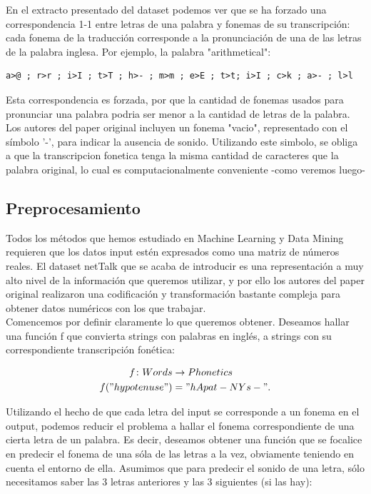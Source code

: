 \documentclass[paper=a4, fontsize=11pt]{scrartcl} %
\numberwithin{equation}{section} %
\numberwithin{figure}{section} %
\numberwithin{table}{section} %
\begin{document}
En el extracto presentado del dataset podemos ver que se ha forzado una correspondencia 1-1 entre letras de una palabra y fonemas de su transcripción: cada fonema de la traducción corresponde a la pronunciación de una de las letras de la palabra inglesa. Por ejemplo, la palabra "arithmetical": 

\begin{center}

\begin{BVerbatim}
a>@ ; r>r ; i>I ; t>T ; h>- ; m>m ; e>E ; t>t; i>I ; c>k ; a>- ; l>l               
\end{BVerbatim}

\end{center}

Esta correspondencia es forzada, por que la cantidad de fonemas usados para pronunciar una palabra podria ser menor a la cantidad de letras de la palabra. Los autores del paper original incluyen un fonema "vacio", representado con el símbolo '-', para indicar la ausencia de sonido. Utilizando este simbolo, se obliga a que la transcripcion fonetica tenga la misma cantidad de caracteres que la palabra original, lo cual es computacionalmente conveniente -como veremos luego-



\subsection{Preprocesamiento}

Todos los métodos que hemos estudiado en Machine Learning y Data Mining requieren que los datos input estén  expresados como una matriz de números reales. El dataset netTalk que se acaba de introducir es una representación a muy alto nivel de la información que queremos utilizar, y por ello los autores del paper original realizaron una codificación y transformación bastante compleja para obtener datos numéricos con los que trabajar. \\

Comencemos por definir claramente lo que queremos obtener. Deseamos hallar una función f que convierta strings con palabras en inglés, a strings con su correspondiente transcripción fonética:

\begin{align*}
  f \colon Words &\to Phonetics \\
  f("hypotenuse") &= "hApat-NYs-".
\end{align*}

Utilizando el hecho de que cada letra del input se corresponde a un fonema en el output, podemos reducir el problema a hallar el fonema correspondiente de una cierta letra de un palabra. Es decir, deseamos obtener una función que se focalice en predecir el fonema de una sóla de las letras a la vez, obviamente teniendo en cuenta el entorno de ella. Asumimos que para predecir el sonido de una letra, sólo necesitamos saber las 3 letras anteriores y las 3 siguientes (si las hay):
\end{document}
